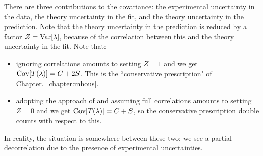 \ee
There are three contributions to the covariance: the experimental uncertainty in the data, the theory uncertainty in the fit, and the theory uncertainty in the prediction. Note that the theory uncertainty in the prediction is reduced by a factor $Z={\rm Var}[\lambda]$, because of the correlation between this and the theory uncertainty in the fit. Note that:
\begin{itemize}
\item ignoring correlations amounts to setting $Z=1$ and we get ${{\rm Cov}}[T(\lambda)] = C + 2S$. This is the ``conservative prescription" of Chapter.~\ref{chapter:mhous}.
\item adopting the approach of \cite{Harland-Lang:2018bxd} and assuming full correlations amounts to setting $Z=0$ and we get ${{\rm Cov}}[T(\lambda)] = C + S$, so the conservative prescription double counts with respect to this.
\end{itemize}
In reality, the situation is somewhere between these two; we see a partial decorrelation due to the presence of experimental uncertainties.

